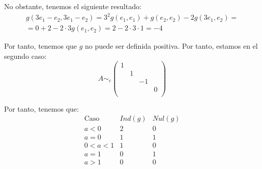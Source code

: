 \begin{ejercicio}
\begin{itemize}
        No obstante, tenemos el siguiente resultado:
        \begin{multline*}
            g(3e_1 - e_2, 3e_1 - e_2) = 3^2g(e_1, e_1) + g(e_2, e_2) -2g(3e_1, e_2) =\\= 0 + 2 -2\cdot 3g(e_1, e_2) = 2-2\cdot 3\cdot 1 = -4
        \end{multline*}

        Por tanto, tenemos que $g$ no puede ser definida positiva. Por tanto, estamos en el segundo caso:
        \begin{equation*}
            A\sim_c\left(\begin{array}{cccc}
                 1&&&  \\
                 &1&& \\
                 &&-1& \\
                 &&&0 \\
            \end{array}\right)
        \end{equation*}
        
    \end{itemize}
    
    Por tanto, tenemos que:
    \begin{equation}\label{Ej12:Resultados}
        \begin{array}{c|c|c}
            \text{Caso} & Ind(g) & Nul(g) \\ \hline
            a < 0 & 2 & 0 \\
            a=0 & 1 & 1\\
            0 < a < 1 & 1 & 0\\
            a=1 & 0 & 1 \\
            a > 1 & 0 & 0 \\           
        \end{array}
    \end{equation}    
\end{ejercicio}

